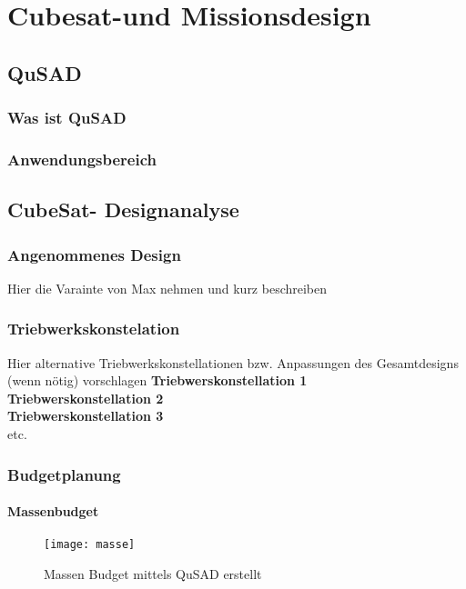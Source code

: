 \chapter{Cubesat-und Missionsdesign}
		\section{QuSAD}
				\subsection{Was ist QuSAD}
				\subsection{Anwendungsbereich}
		\section{CubeSat- Designanalyse}
				\subsection{Angenommenes Design}
						Hier die Varainte von Max nehmen und kurz beschreiben
				\subsection{Triebwerkskonstelation}
				Hier alternative Triebwerkskonstellationen bzw. Anpassungen des Gesamtdesigns (wenn nötig) vorschlagen
								\textbf{Triebwerskonstellation 1}\\
								\textbf{Triebwerskonstellation 2}\\
								\textbf{Triebwerskonstellation 3}\\
								 etc.
				\subsection{Budgetplanung}
				
						\subsubsection{Massenbudget}
								
										\begin{figure}[h]
											\centering
												\texttt{[image: masse]}
											\caption{Massen Budget mittels QuSAD erstellt}
											\label{fig:masse}
										\end{figure}
										
